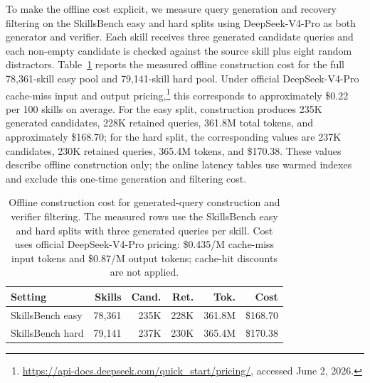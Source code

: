 \documentclass[11pt]{article}
\begin{document}
To make the offline cost explicit, we measure query generation and recovery filtering on the SkillsBench easy and hard splits using DeepSeek-V4-Pro as both generator and verifier. Each skill receives three generated candidate queries and each non-empty candidate is checked against the source skill plus eight random distractors. Table~\ref{tab:offline-cost-sample} reports the measured offline construction cost for the full 78,361-skill easy pool and 79,141-skill hard pool. Under official DeepSeek-V4-Pro cache-miss input and output pricing,\footnote{\url{https://api-docs.deepseek.com/quick_start/pricing/}, accessed June 2, 2026.} this corresponds to approximately \$0.22 per 100 skills on average. For the easy split, construction produces 235K generated candidates, 228K retained queries, 361.8M total tokens, and approximately \$168.70; for the hard split, the corresponding values are 237K candidates, 230K retained queries, 365.4M tokens, and \$170.38. These values describe offline construction only; the online latency tables use warmed indexes and exclude this one-time generation and filtering cost.

\begin{table}[t]
\centering
\scriptsize
\setlength{\tabcolsep}{2.5pt}
\begin{tabular}{lrrrrr}
\hline
Setting & Skills & Cand. & Ret. & Tok. & Cost \\
\hline
SkillsBench easy & 78,361 & 235K & 228K & 361.8M & \$168.70 \\
SkillsBench hard & 79,141 & 237K & 230K & 365.4M & \$170.38 \\
\hline
\end{tabular}
\caption{Offline construction cost for generated-query construction and verifier filtering. The measured rows use the SkillsBench easy and hard splits with three generated queries per skill. Cost uses official DeepSeek-V4-Pro pricing: \$0.435/M cache-miss input tokens and \$0.87/M output tokens; cache-hit discounts are not applied.}
\label{tab:offline-cost-sample}
\end{table}
\end{document}

